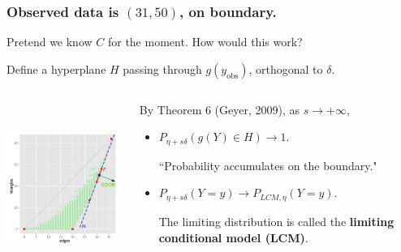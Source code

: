 \documentclass[ 10pt]{beamer}
\newcommand{\yobs}{y_{\text{obs}}}
\begin{document}
\frame
{
	\frametitle{Observed data is $(31,50)$, on boundary.}
Pretend we know $C$ for the moment.  How would this work?
\vspace{2mm}

Define a hyperplane $H$ passing through $g(\yobs)$, orthogonal to $\delta$.
\begin{columns}[]
\begin{column}[T]{0.43\textwidth}
\includegraphics[height=2.2in]{g9-H.png}
\end{column}
\begin{column}[t]{0.57\textwidth}

\pause
By Theorem 6 (Geyer, 2009), as $s \to +\infty$,
\vspace{1mm}
\begin{itemize}
\item $P_{\eta + s \delta}( g(Y) \in H) \to 1.$
\vspace{1mm}

``Probability accumulates on the boundary."
\vspace{3mm}

\pause
\item $P_{\eta + s \delta}( Y = y) \to P_{LCM, \eta}( Y = y)$.
\vspace{1mm}

The limiting distribution is called the \textbf{limiting conditional model (LCM)}.
\end{itemize}
\end{column}
\end{columns}
}
\end{document}

